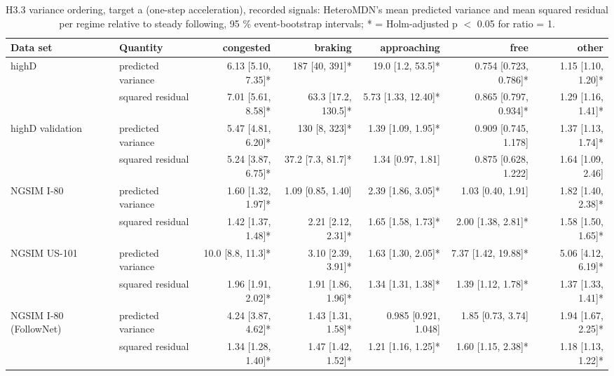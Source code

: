 \begin{table}[htbp]
\centering
\footnotesize
\caption{H3.3 variance ordering, target a (one-step acceleration), recorded signals: HeteroMDN's mean predicted variance and mean squared residual per regime relative to steady following, 95 \% event-bootstrap intervals; * = Holm-adjusted p $<$ 0.05 for ratio = 1.}
\label{tab:t3-regime-variance--raw--a}
\begin{tabular}{llrrrrr}
\toprule
Data set & Quantity & congested & braking & approaching & free & other \\
\midrule
highD & predicted variance & 6.13 [5.10, 7.35]* & 187 [40, 391]* & 19.0 [1.2, 53.5]* & 0.754 [0.723, 0.786]* & 1.15 [1.10, 1.20]* \\
 & squared residual & 7.01 [5.61, 8.58]* & 63.3 [17.2, 130.5]* & 5.73 [1.33, 12.40]* & 0.865 [0.797, 0.934]* & 1.29 [1.16, 1.41]* \\
\midrule
highD validation & predicted variance & 5.47 [4.81, 6.20]* & 130 [8, 323]* & 1.39 [1.09, 1.95]* & 0.909 [0.745, 1.178] & 1.37 [1.13, 1.74]* \\
 & squared residual & 5.24 [3.87, 6.75]* & 37.2 [7.3, 81.7]* & 1.34 [0.97, 1.81] & 0.875 [0.628, 1.222] & 1.64 [1.09, 2.46] \\
\midrule
NGSIM I-80 & predicted variance & 1.60 [1.32, 1.97]* & 1.09 [0.85, 1.40] & 2.39 [1.86, 3.05]* & 1.03 [0.40, 1.91] & 1.82 [1.40, 2.38]* \\
 & squared residual & 1.42 [1.37, 1.48]* & 2.21 [2.12, 2.31]* & 1.65 [1.58, 1.73]* & 2.00 [1.38, 2.81]* & 1.58 [1.50, 1.65]* \\
\midrule
NGSIM US-101 & predicted variance & 10.0 [8.8, 11.3]* & 3.10 [2.39, 3.91]* & 1.63 [1.30, 2.05]* & 7.37 [1.42, 19.88]* & 5.06 [4.12, 6.19]* \\
 & squared residual & 1.96 [1.91, 2.02]* & 1.91 [1.86, 1.96]* & 1.34 [1.31, 1.38]* & 1.39 [1.12, 1.78]* & 1.37 [1.33, 1.41]* \\
\midrule
NGSIM I-80 (FollowNet) & predicted variance & 4.24 [3.87, 4.62]* & 1.43 [1.31, 1.58]* & 0.985 [0.921, 1.048] & 1.85 [0.73, 3.74] & 1.94 [1.67, 2.25]* \\
 & squared residual & 1.34 [1.28, 1.40]* & 1.47 [1.42, 1.52]* & 1.21 [1.16, 1.25]* & 1.60 [1.15, 2.38]* & 1.18 [1.13, 1.22]* \\

\end{tabular}
\end{table}
